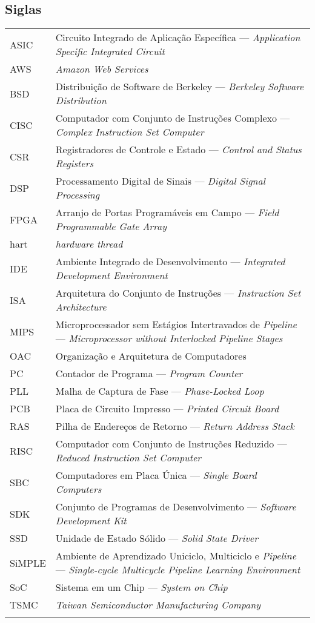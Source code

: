 \subsection*{Siglas}

\begin{tabular}{p{}p{}}
    {ASIC}      & {Circuito Integrado de Aplicação Específica --- \textit{Application Specific Integrated Circuit}}\tabularnewline{}
    {AWS}       & {\textit{Amazon Web Services}} \tabularnewline{}
    {BSD}       & {Distribuição de Software de Berkeley --- \textit{Berkeley Software Distribution}}\tabularnewline{}
    {CISC}      & {Computador com Conjunto de Instruções Complexo --- \textit{Complex Instruction Set Computer}} \tabularnewline{}
    {CSR}       & {Registradores de Controle e Estado --- \textit{Control and Status Registers}} \tabularnewline{}
    {DSP}       & {Processamento Digital de Sinais --- \textit{Digital Signal Processing}} \tabularnewline{}
    {FPGA}      & {Arranjo de Portas Programáveis em Campo --- \textit{Field Programmable Gate Array}} \tabularnewline{}
    {hart}      & {\textit{hardware thread}} \tabularnewline{}
    {IDE}       & {Ambiente Integrado de Desenvolvimento --- \textit{Integrated Development Environment}} \tabularnewline{}
    {ISA}       & {Arquitetura do Conjunto de Instruções --- \textit{Instruction Set Architecture}} \tabularnewline{}
    {MIPS}      & {Microprocessador sem Estágios Intertravados de \textit{Pipeline} --- \textit{Microprocessor without Interlocked Pipeline Stages}} \tabularnewline{}
    {OAC}       & {Organização e Arquitetura de Computadores} \tabularnewline{}
    {PC}        & {Contador de Programa --- \textit{Program Counter}} \tabularnewline{}
    {PLL}       & {Malha de Captura de Fase --- \textit{Phase-Locked Loop}} \tabularnewline{}
    {PCB}       & {Placa de Circuito Impresso --- \textit{Printed Circuit Board}} \tabularnewline{}
    {RAS}       & {Pilha de Endereços de Retorno --- \textit{Return Address Stack}} \tabularnewline{}
    {RISC}      & {Computador com Conjunto de Instruções Reduzido --- \textit{Reduced Instruction Set Computer}} \tabularnewline{}
    {SBC}       & {Computadores em Placa Única --- \textit{Single Board Computers}} \tabularnewline{}
    {SDK}       & {Conjunto de Programas de Desenvolvimento --- \textit{Software Development Kit}} \tabularnewline{}
    {SSD}       & {Unidade de Estado Sólido --- \textit{Solid State Driver}} \tabularnewline{}
    {SiMPLE}    & {Ambiente de Aprendizado Uniciclo, Multiciclo e \textit{Pipeline} --- \textit{Single-cycle Multicycle Pipeline Learning Environment}} \tabularnewline{}
    {SoC}       & {Sistema em um Chip --- \textit{System on Chip}} \tabularnewline{}
    {TSMC}      & {\textit{Taiwan Semiconductor Manufacturing Company}} \tabularnewline{}
\end{tabular}

